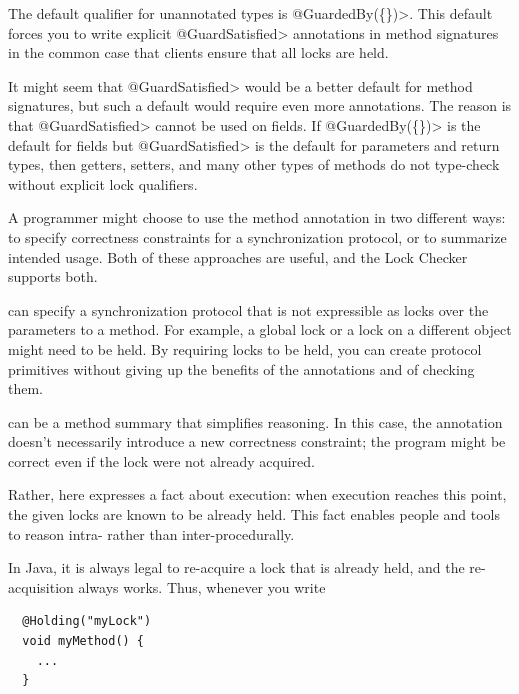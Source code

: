The default qualifier for unannotated types is \<@GuardedBy(\{\})>.
This default forces you to write explicit \<@GuardSatisfied> annotations in
method signatures in the common case that clients ensure that all locks are
held.

It might seem that \<@GuardSatisfied> would be a better default for
method signatures, but such a default would require even more annotations.
The reason is that \<@GuardSatisfied> cannot be used on fields.  If
\<@GuardedBy(\{\})> is the default for fields but \<@GuardSatisfied> is the
default for parameters and return types, then getters, setters, and many
other types of methods do not type-check without explicit lock qualifiers.



A programmer might choose to use the  method annotation in
two different ways:  to specify correctness constraints for a
synchronization protocol, or to summarize intended usage.  Both of these
approaches are useful, and the Lock Checker supports both.


   can specify a synchronization protocol that
  is not expressible as locks over the parameters to a method.  For example, a global lock
  or a lock on a different object might need to be held.  By requiring locks to be
  held, you can create protocol primitives without giving up
  the benefits of the annotations and of checking them.


   can be a method summary that simplifies reasoning.  In
  this case, the  annotation doesn't necessarily introduce a new
  correctness constraint; the program might be correct even if the lock
  were not already acquired.

  Rather, here  expresses a fact about execution:  when
  execution reaches this point, the given locks are known to be already held.  This
  fact enables people and tools to reason intra- rather than
  inter-procedurally.

  In Java, it is always legal to re-acquire a lock that is already held,
  and the re-acquisition always works.  Thus, whenever you write

\begin{Verbatim}
  @Holding("myLock")
  void myMethod() {
    ...
  }
\end{Verbatim}

